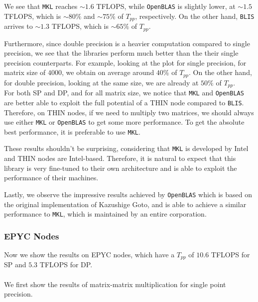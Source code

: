 \documentclass{report}
\begin{document}
We see that \texttt{MKL} reaches $\sim1.6$ TFLOPS, 
while \texttt{OpenBLAS} is slightly lower, at $\sim1.5$ TFLOPS, which is $\sim80\%$ and 
$\sim75\%$ of $T_{pp}$, respectively. On the other hand, \texttt{BLIS} arrives to 
$\sim1.3$ TFLOPS, which is $\sim65\%$ of $T_{pp}$.

Furthermore, since double precision is a heavier computation compared to single 
precision, we see that the libraries perform much better than the their single precision 
counterparts.
For example, looking at the plot for single precision, for matrix size of $4000$, 
we obtain on average around $40\%$ of $T_{pp}$. On the other hand, for double precision, 
looking at the same size, we are already at $50\%$ of $T_{pp}$.
\\

For both SP and DP, and for all matrix size, we notice that \texttt{MKL} and 
\texttt{OpenBLAS} are better able to exploit the full potential of a THIN node 
compared to \texttt{BLIS}. Therefore, on THIN nodes, if we need to multiply 
two matrices, we should always use either \texttt{MKL} or \texttt{OpenBLAS} to 
get some more performance. To get the absolute best performance, it is preferable 
to use \texttt{MKL}.

These results shouldn't be surprising, considering 
that \texttt{MKL} is developed by Intel and THIN nodes are Intel-based.
Therefore, it is natural to expect that this library is very fine-tuned to 
their own architecture and is able to exploit the performance of their machines.

Lastly, we observe the impressive results achieved by \texttt{OpenBLAS} which 
is based on the original implementation of Kazushige Goto, and is able to achieve a similar performance to 
\texttt{MKL}, which is maintained by an entire corporation.

\subsubsection{EPYC Nodes}

Now we show the results on EPYC nodes, which have a $T_{pp}$ of $10.6$ TFLOPS 
for SP and $5.3$ TFLOPS for DP.
\\\\
We first show the results of matrix-matrix multiplication for single point 
precision.
\end{document}
